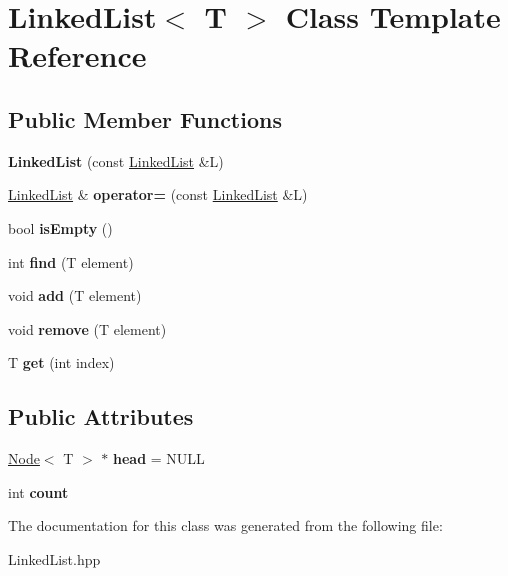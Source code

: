 \hypertarget{class_linked_list}{}\section{Linked\+List$<$ T $>$ Class Template Reference}
\label{class_linked_list}
\subsection*{Public Member Functions}
\begin{DoxyCompactItemize}
\item 
\mbox{\label{class_linked_list_affd4c020b87fafe33c34e6fc35b27094}} 
{\bfseries Linked\+List} (const \mbox{\hyperlink{class_linked_list}{Linked\+List}} \&L)
\item 
\mbox{\label{class_linked_list_a57c940d0f7bf631739fa6b7f90097c28}} 
\mbox{\hyperlink{class_linked_list}{Linked\+List}} \& {\bfseries operator=} (const \mbox{\hyperlink{class_linked_list}{Linked\+List}} \&L)
\item 
\mbox{\label{class_linked_list_a7ecbb28e82117a680839ed0dc28ebdce}} 
bool {\bfseries is\+Empty} ()
\item 
\mbox{\label{class_linked_list_a924e217dd525b84492e9f0dc61db96bc}} 
int {\bfseries find} (T element)
\item 
\mbox{\label{class_linked_list_ab7364799e5965dd59d4f5952cb953287}} 
void {\bfseries add} (T element)
\item 
\mbox{\label{class_linked_list_a6c4973ae9956ddb037a9093cffa2adb1}} 
void {\bfseries remove} (T element)
\item 
\mbox{\label{class_linked_list_a25079ed9b408efad63a1522c818d8705}} 
T {\bfseries get} (int index)
\end{DoxyCompactItemize}
\subsection*{Public Attributes}
\begin{DoxyCompactItemize}
\item 
\mbox{\label{class_linked_list_a35e09287e2d2943707b011208e7a8ed2}} 
\mbox{\hyperlink{class_node}{Node}}$<$ T $>$ $\ast$ {\bfseries head} = N\+U\+LL
\item 
\mbox{\label{class_linked_list_a22552fa8782967c1d31c560c96d319f7}} 
int {\bfseries count}
\end{DoxyCompactItemize}


The documentation for this class was generated from the following file\+:\begin{DoxyCompactItemize}
\item 
Linked\+List.\+hpp\end{DoxyCompactItemize}
